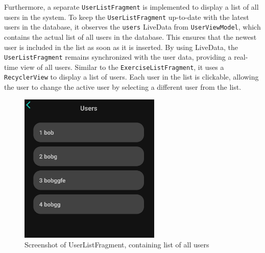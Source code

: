 Furthermore, a separate \texttt{UserListFragment} is implemented to display a list of all users in the system. 
To keep the \texttt{UserListFragment} up-to-date with the latest users in the database, it observes the \texttt{users} LiveData from \texttt{UserViewModel}, which contains the actual list of all users in the database. 
This ensures that the newest user is included in the list as soon as it is inserted. By using LiveData, the \texttt{UserListFragment} remains synchronized with the user data, providing a real-time view of all users.
Similar to the \texttt{ExerciseListFragment}, it uses a \texttt{RecyclerView} to display a list of users. 
Each user in the list is clickable, allowing the user to change the active user by selecting a different user from the list.
\begin{figure}[H]
    \centering
    \includegraphics[width=0.6\textwidth]{images/userlistfragment-screenshot.jpeg}
    \caption{Screenshot of UserListFragment, containing list of all users}
    \label{fig:userlistfragment}
\end{figure}



